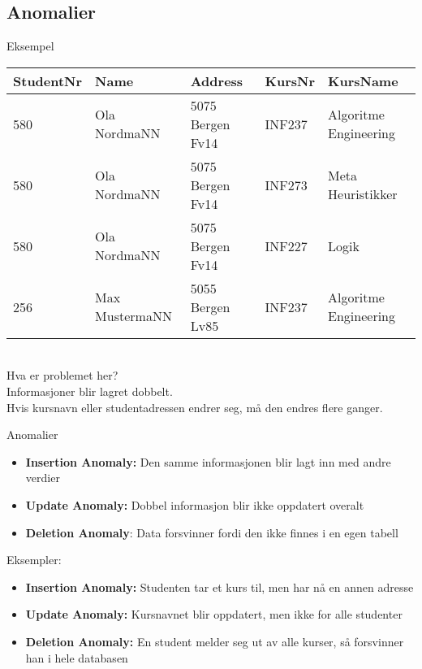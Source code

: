 \subsection*{Anomalier}
\begin{frame}{Eksempel}
\begin{tabular}{l|l|l|l|l}
 StudentNr & Name & Address & KursNr & KursName \\\hline
 580 & Ola NordmaNN & 5075 Bergen Fv14 & INF237 & Algoritme Engineering\\
 580 & Ola NordmaNN & 5075 Bergen Fv14 & INF273 & Meta Heuristikker\\
 580 & Ola NordmaNN & 5075 Bergen Fv14 & INF227 & Logik\\
 256 & Max MustermaNN & 5055 Bergen Lv85 & INF237 & Algoritme Engineering\\
\end{tabular}
\\[5mm]
Hva er problemet her?\\\pause
Informasjoner blir lagret dobbelt.\\
Hvis kursnavn eller studentadressen endrer seg, må den endres flere ganger.
\end{frame}

\begin{frame}{Anomalier}
\begin{itemize}[<+->]
    \item \textbf{Insertion Anomaly:} Den samme informasjonen blir lagt inn med andre verdier
    \item \textbf{Update Anomaly:} Dobbel informasjon blir ikke oppdatert overalt
    \item \textbf{Deletion Anomaly}: Data forsvinner fordi den ikke finnes i en egen tabell
\end{itemize}

\pause

\medskip

Eksempler:
\begin{itemize}[<+->]
    \item \textbf{Insertion Anomaly:} Studenten tar et kurs til, men har nå en annen adresse 
    \item \textbf{Update Anomaly:} Kursnavnet blir oppdatert, men ikke for alle studenter
    \item \textbf{Deletion Anomaly:} En student melder seg ut av alle kurser, så forsvinner han i hele databasen
\end{itemize}
\end{frame}

